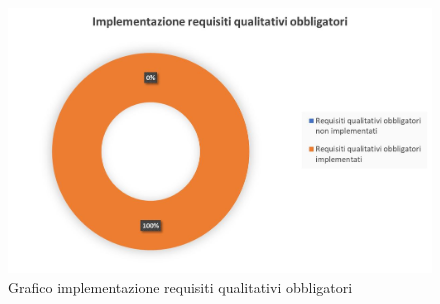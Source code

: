         \begin{figure}[H]
            \includegraphics[width=\textwidth,height=\textheight,keepaspectratio]{./img/Grafici/implementazione_requisiti_qualitativi_obbligatori.jpg}
            \caption{Grafico implementazione requisiti qualitativi obbligatori}
        \end{figure}
